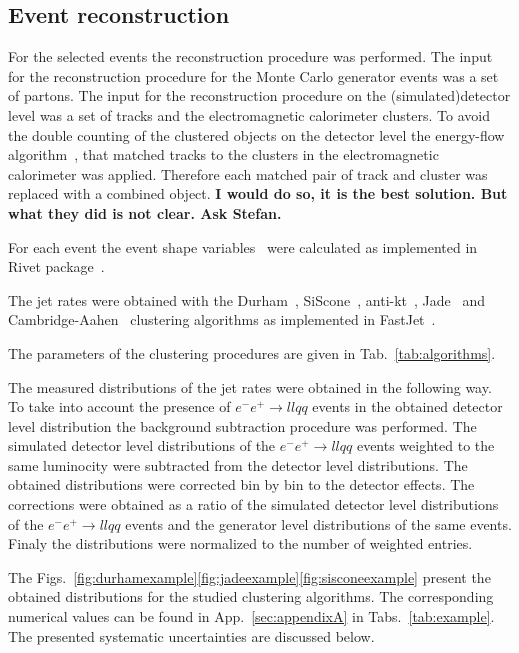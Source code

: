 \subsection{Event reconstruction}
\label{sec:reconstruction}
For the selected events the reconstruction procedure was performed.
The input for the reconstruction procedure for the Monte Carlo generator events
was a set of partons.
The input for the reconstruction procedure on the (simulated)detector level
 was a set of tracks and the electromagnetic calorimeter clusters.
To avoid the double counting of the clustered objects on the detector level the energy-flow 
algorithm~\cite{Ackerstaff:1997nga,Abbiendi:1999sy}, that matched tracks to the 
 clusters in the electromagnetic calorimeter was applied. Therefore each 
 matched pair of track and cluster was replaced with a combined object.
 {\bf I would do so, it is the best solution. But what they did is not clear. Ask Stefan.}

For each event the event shape variables~\cite{OPAL:2011aa} 
were calculated  as  implemented in Rivet package~\cite{Buckley:2010ar}.

The jet rates were obtained with the Durham~\cite{Catani:1991hj}, SiScone~\cite{Cacciari:2005hq}, anti-kt~\cite{Cacciari:2008gp}, Jade~\cite{Bartel:1986ua}
  and Cambridge-Aahen~\cite{Dokshitzer:1997in}
clustering algorithms as implemented in FastJet~\cite{Cacciari:2011ma}.

The parameters of the clustering procedures are given in Tab.~\ref{tab:algorithms}.
\TABalgorithms

The measured distributions of the jet rates were obtained in the following way.
To take into account the presence of $e^-e^+ \rightarrow llqq$ events in the 
obtained detector level distribution the background subtraction procedure was performed.
The simulated detector level distributions of the $e^-e^+ \rightarrow llqq$ events 
weighted to the same luminocity were subtracted from the detector level distributions.
The obtained distributions were corrected bin by bin to the detector effects. 
The corrections were obtained as a ratio of 
the simulated detector level distributions of the $e^-e^+ \rightarrow llqq$ events 
and the generator level distributions of the same events.
Finaly the distributions were normalized to the number of weighted entries.

The Figs.~\ref{fig:durhamexample}\ref{fig:jadeexample}\ref{fig:sisconeexample}
present the obtained distributions for the studied clustering algorithms.
\FIGdurhamexample
\FIGjadeexample
\FIGsisconeexample
The corresponding numerical values can be found in App.~\ref{sec:appendixA}
in Tabs.~\ref{tab:example}. The  presented systematic uncertainties are discussed below.

